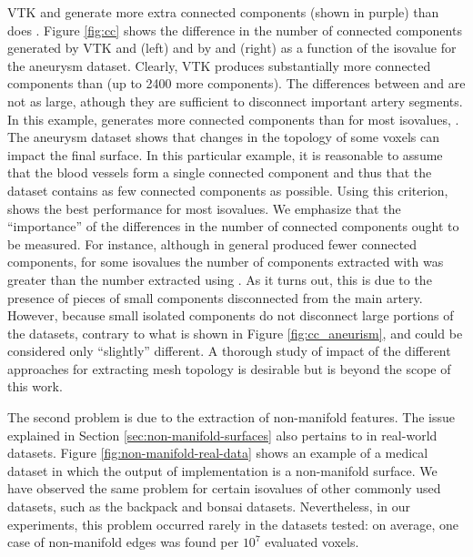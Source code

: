 VTK and \mc{}  generate more extra connected components (shown in purple) than does \cmc. Figure \ref{fig:cc} shows the difference in the number of connected components generated by VTK and \cmc{} (left) and by \mc{} and \cmc{} (right) as a function of the isovalue for the aneurysm dataset. 
%
Clearly, VTK produces substantially more connected components than  \cmc{}  (up to 2400 more components).  The differences between \mc{} and \cmc{} are not as large, athough they are sufficient to disconnect important artery segments. In this example, \mc{} generates more  connected components than \cmc for most isovalues, . 
%
The aneurysm dataset shows that  changes in the topology of some voxels can impact the final surface. 
%
In this particular example, it is reasonable to assume that the blood vessels  form a single connected component and thus that the dataset contains as few connected components as possible. Using this criterion, \cmc{} shows the best performance for most isovalues. 
%
We emphasize that the ``importance'' of the differences in the number of connected components ought to be measured. For instance, although in general \cmc{} produced fewer connected components, for some isovalues the number of components extracted with \cmc{} was greater than the number extracted using \mc{}. As it turns out, this is due to the presence of pieces of small components disconnected from the main artery. However, because small isolated components do not disconnect large portions of the datasets, contrary to what is shown in Figure \ref{fig:cc_aneurism},  \mc{} and \cmc{} could be considered only ``slightly'' different. A thorough study of impact of the different approaches for extracting mesh topology is desirable but is beyond the scope of this work.

The second problem is due to the extraction of non-manifold features. The issue explained in Section \ref{sec:non-manifold-surfaces} also pertains to in real-world datasets.  Figure \ref{fig:non-manifold-real-data} shows an example of a medical dataset in which the output of \mc{} implementation is a non-manifold surface. We have observed the same problem for certain isovalues of other commonly used datasets, such as the backpack and bonsai datasets. Nevertheless, in our experiments, this problem occurred  rarely in the datasets tested:  on average, one case of non-manifold edges was found per $10^7$ evaluated voxels.

